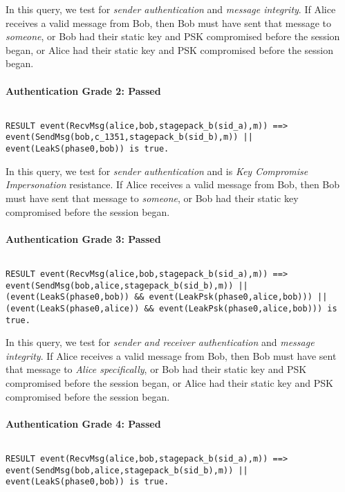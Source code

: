 In this query, we test for \emph{sender authentication} and \emph{message integrity}. If Alice receives a valid message from Bob, then Bob must have sent that message to \emph{someone}, or Bob had their static key and PSK compromised before the session began, or Alice had their static key and PSK compromised before the session began.


\paragraph{Authentication Grade 2: Passed}$ $
\begin{lstlisting}
RESULT event(RecvMsg(alice,bob,stagepack_b(sid_a),m)) ==> event(SendMsg(bob,c_1351,stagepack_b(sid_b),m)) || event(LeakS(phase0,bob)) is true.
\end{lstlisting}

In this query, we test for \emph{sender authentication} and is \emph{Key Compromise Impersonation} resistance. If Alice receives a valid message from Bob, then Bob must have sent that message to \emph{someone}, or Bob had their static key compromised before the session began.


\paragraph{Authentication Grade 3: Passed}$ $
\begin{lstlisting}
RESULT event(RecvMsg(alice,bob,stagepack_b(sid_a),m)) ==> event(SendMsg(bob,alice,stagepack_b(sid_b),m)) || (event(LeakS(phase0,bob)) && event(LeakPsk(phase0,alice,bob))) || (event(LeakS(phase0,alice)) && event(LeakPsk(phase0,alice,bob))) is true.
\end{lstlisting}

In this query, we test for \emph{sender and receiver authentication} and \emph{message integrity}. If Alice receives a valid message from Bob, then Bob must have sent that message to \emph{Alice specifically}, or Bob had their static key and PSK compromised before the session began, or Alice had their static key and PSK compromised before the session began.


\paragraph{Authentication Grade 4: Passed}$ $
\begin{lstlisting}
RESULT event(RecvMsg(alice,bob,stagepack_b(sid_a),m)) ==> event(SendMsg(bob,alice,stagepack_b(sid_b),m)) || event(LeakS(phase0,bob)) is true.
\end{lstlisting}

